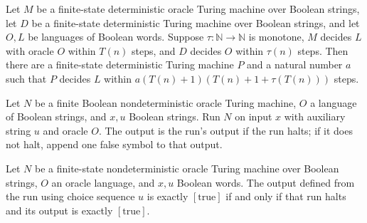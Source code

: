 \begin{theorem}
\label{Turing.FinOracleTM.exists_plain_decider}
\leanok
{}
Let $M$ be a finite-state deterministic oracle Turing machine over Boolean strings, let
$D$ be a finite-state deterministic Turing machine over Boolean strings, and let $O,L$
be languages of Boolean words. Suppose $\tau:\mathbb{N}\to\mathbb{N}$ is monotone, $M$
decides $L$ with oracle $O$ within $T(n)$ steps, and $D$ decides $O$ within $\tau(n)$
steps. Then there are a finite-state deterministic Turing machine $P$ and a natural
number $a$ such that $P$ decides $L$ within $a(T(n)+1)(T(n)+1+\tau(T(n)))$ steps.
\end{theorem}

\begin{definition}
\label{Turing.FinOracleNDTM.choiceOut}
\leanok
{}
Let $N$ be a finite Boolean nondeterministic oracle Turing machine, $O$ a language of
Boolean strings, and $x,u$ Boolean strings. Run $N$ on input $x$ with auxiliary string
$u$ and oracle $O$. The output is the run's output if the run halts; if it does not
halt, append one false symbol to that output.
\end{definition}

\begin{theorem}
\label{Turing.FinOracleNDTM.choiceOut_eq_true_iff}
\leanok
{}
Let $N$ be a finite-state nondeterministic oracle Turing machine over Boolean strings,
$O$ an oracle language, and $x,u$ Boolean words. The output defined from the run using
choice sequence $u$ is exactly $[\mathrm{true}]$ if and only if that run halts and its
output is exactly $[\mathrm{true}]$.
\end{theorem}

